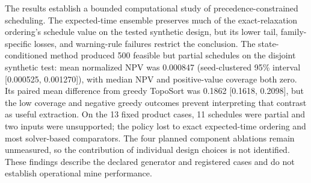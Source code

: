\documentclass[11pt]{article}
\begin{document}
The results establish a bounded computational study of precedence-constrained scheduling. The expected-time ensemble preserves much of the exact-relaxation ordering's schedule value on the tested synthetic design, but its lower tail, family-specific losses, and warning-rule failures restrict the conclusion. The state-conditioned method produced 500 feasible but partial schedules on the disjoint synthetic test: mean normalized NPV was 0.000847 (seed-clustered 95\% interval [0.000525, 0.001270]), with median NPV and positive-value coverage both zero. Its paired mean difference from greedy TopoSort was 0.1862 [0.1618, 0.2098], but the low coverage and negative greedy outcomes prevent interpreting that contrast as useful extraction. On the 13 fixed product cases, 11 schedules were partial and two inputs were unsupported; the policy lost to exact expected-time ordering and most solver-based comparators. The four planned component ablations remain unmeasured, so the contribution of individual design choices is not identified. These findings describe the declared generator and registered cases and do not establish operational mine performance.
\end{document}
